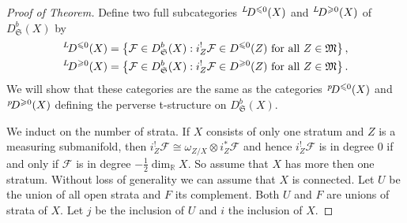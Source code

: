 \documentclass{compositio}
\theoremstyle{plain}
\theoremstyle{definition}
\theoremstyle{remark}
\newcommand\sheaf{\mathcal}
\newcommand\setset\mathfrak
\newcommand\perv[1][p]{\mkern1mu{}^{#1}\mkern-3mu}
\newcommand\measuringFam{\mathfrak M}
\begin{document}
\begin{proof}[Proof of Theorem]
    Define two full subcategories $\perv[L] D^{\le 0}(X)$ and $\perv[L] D^{\ge 0}(X)$ of $D^b_{\setset S}(X)$ by
    \begin{align*}
        \perv[L] D^{\leq 0}(X) & = \left\{ \sheaf F \in  D^b_{\setset S}(X) : i_Z^! \sheaf F \in  D^{\leq 0}(Z) \text{ for all $Z \in  \measuringFam$} \right\}, \\
        \perv[L] D^{\geq 0}(X) & = \left\{ \sheaf F \in  D^b_{\setset S}(X) : i_Z^! \sheaf F \in  D^{\geq 0}(Z) \text{ for all $Z \in  \measuringFam$} \right\}.
    \end{align*}
    We will show that these categories are the same as the categories $\perv D^{\leq 0}(X)$ and $\perv D^{\geq 0}(X)$ defining the perverse t-structure on $D^b_{\setset S}(X)$.

    We induct on the number of strata.
    If $X$ consists of only one stratum and $Z$ is a measuring submanifold, then $i_Z^! \sheaf F \cong \omega _{Z/X} \otimes i_Z^* \sheaf F$ and hence $i_Z^! \sheaf F$ is in degree $0$ if and only if $\sheaf F$ is in degree $-\frac 12 \dim_\mathbb{R} X$.
    So assume that $X$ has more then one stratum.
    Without loss of generality we can assume that $X$ is connected.
    Let $U$ be the union of all open strata and $F$ its complement.
    Both $U$ and $F$ are unions of strata of $X$.
    Let $j$ be the inclusion of $U$ and $i$ the inclusion of $X$. 
    

\end{proof}
\end{document}
